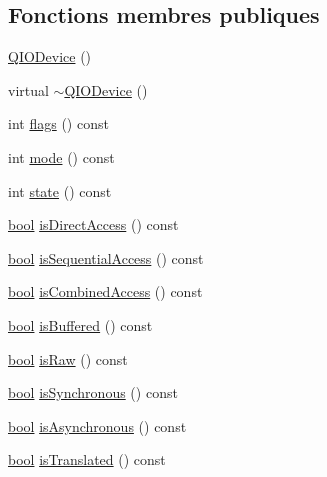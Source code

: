 \subsection*{Fonctions membres publiques}
\begin{DoxyCompactItemize}
\item 
\hyperlink{class_q_i_o_device_a6ccc9ce76acdca224d0c3ded7d303f02}{Q\+I\+O\+Device} ()
\item 
virtual \hyperlink{class_q_i_o_device_a2510afba0e06ba9edc0d518fa2a8d1fa}{$\sim$\+Q\+I\+O\+Device} ()
\item 
int \hyperlink{class_q_i_o_device_ac19806bd5bc9aca2bbd50978965983b1}{flags} () const 
\item 
int \hyperlink{class_q_i_o_device_aed9e6cac66de3b004168bb408938f4e7}{mode} () const 
\item 
int \hyperlink{class_q_i_o_device_ac3aba58c8c45ea61daf8fd9434c6fe8a}{state} () const 
\item 
\hyperlink{qglobal_8h_a1062901a7428fdd9c7f180f5e01ea056}{bool} \hyperlink{class_q_i_o_device_a8cf6911584e86da6f1c014696b778bfa}{is\+Direct\+Access} () const 
\item 
\hyperlink{qglobal_8h_a1062901a7428fdd9c7f180f5e01ea056}{bool} \hyperlink{class_q_i_o_device_a9a00f8fae2ab8591c195b847c02009ba}{is\+Sequential\+Access} () const 
\item 
\hyperlink{qglobal_8h_a1062901a7428fdd9c7f180f5e01ea056}{bool} \hyperlink{class_q_i_o_device_a7532af9af78fa9899a168e8b7f112574}{is\+Combined\+Access} () const 
\item 
\hyperlink{qglobal_8h_a1062901a7428fdd9c7f180f5e01ea056}{bool} \hyperlink{class_q_i_o_device_aaf661d46886be8dd95ac409a61dce67a}{is\+Buffered} () const 
\item 
\hyperlink{qglobal_8h_a1062901a7428fdd9c7f180f5e01ea056}{bool} \hyperlink{class_q_i_o_device_acfda0035f24d2f9ba479807906ec9718}{is\+Raw} () const 
\item 
\hyperlink{qglobal_8h_a1062901a7428fdd9c7f180f5e01ea056}{bool} \hyperlink{class_q_i_o_device_a02fcf5b4e04b906a03ebce1f7afa8b3c}{is\+Synchronous} () const 
\item 
\hyperlink{qglobal_8h_a1062901a7428fdd9c7f180f5e01ea056}{bool} \hyperlink{class_q_i_o_device_a15f360ffbf9f7813a29eb1d14d6c36a4}{is\+Asynchronous} () const 
\item 
\hyperlink{qglobal_8h_a1062901a7428fdd9c7f180f5e01ea056}{bool} \hyperlink{class_q_i_o_device_a71ba106642ba50478641146399bfc116}{is\+Translated} () const 
\item 

\end{DoxyCompactItemize}
